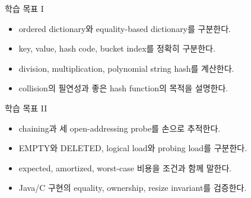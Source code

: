 \begin{frame}[plain]
\vspace*{-8mm}
\titlepage
\end{frame}
\begin{frame}{학습 목표 I}
\small\begin{itemize}
\item ordered dictionary와 equality-based dictionary를 구분한다.
\item key, value, hash code, bucket index를 정확히 구분한다.
\item division, multiplication, polynomial string hash를 계산한다.
\item collision의 필연성과 좋은 hash function의 목적을 설명한다.
\end{itemize}
\end{frame}
\begin{frame}{학습 목표 II}
\small\begin{itemize}
\item chaining과 세 open-addressing probe를 손으로 추적한다.
\item EMPTY와 DELETED, logical load와 probing load를 구분한다.
\item expected, amortized, worst-case 비용을 조건과 함께 말한다.
\item Java/C 구현의 equality, ownership, resize invariant를 검증한다.
\end{itemize}
\end{frame}
